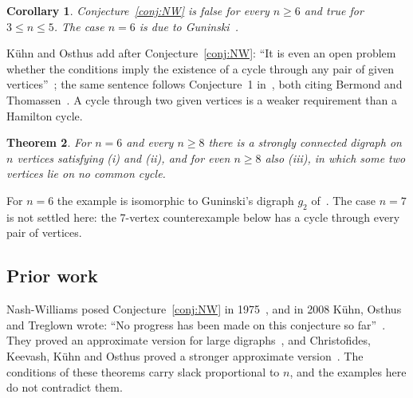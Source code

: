 \documentclass[11pt]{article}
\newtheorem{theorem}{Theorem}
\newtheorem{corollary}[theorem]{Corollary}
\begin{document}
\begin{corollary}\label{cor:NW}
Conjecture~\ref{conj:NW} is false for every $n\ge6$ and true for $3\le n\le5$. The case $n=6$ is due to Guninski~\cite{Gu13,Gu20}.
\end{corollary}

Kühn and Osthus add after Conjecture~\ref{conj:NW}: ``It is even an open problem whether the conditions imply the existence of a cycle through any pair of given vertices''~\cite[Section 2.3]{KO}; the same sentence follows Conjecture~1 in~\cite{KOT}, both citing Bermond and Thomassen~\cite{BT}. A cycle through two given vertices is a weaker requirement than a Hamilton cycle.

\begin{theorem}\label{thm:pairs}
For $n=6$ and every $n\ge8$ there is a strongly connected digraph on $n$ vertices satisfying (i) and (ii), and for even $n\ge8$ also (iii), in which some two vertices lie on no common cycle.
\end{theorem}

For $n=6$ the example is isomorphic to Guninski's digraph $g_2$ of~\cite{Gu20}. The case $n=7$ is not settled here: the 7-vertex counterexample below has a cycle through every pair of vertices.

\subsection{Prior work}
Nash-Williams posed Conjecture~\ref{conj:NW} in 1975~\cite{NW75}, and in 2008 Kühn, Osthus and Treglown wrote: ``No progress has been made on this conjecture so far''~\cite{KOT}. They proved an approximate version for large digraphs~\cite[Theorem 2]{KOT}, and Christofides, Keevash, Kühn and Osthus proved a stronger approximate version~\cite[Theorem 5]{CKKO}. The conditions of these theorems carry slack proportional to $n$, and the examples here do not contradict them.
\end{document}

